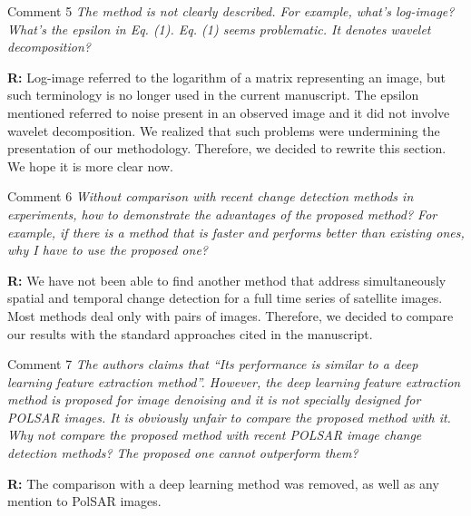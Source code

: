\documentclass[11pt]{report}
\begin{document}
\medskip
\begin{mybox}{Comment 5}
\textit{The method is not clearly described. For example, what’s log-image? What’s the epsilon in Eq. (1). Eq. (1) seems
problematic. It denotes wavelet decomposition?}


\medskip
\textbf{R:} Log-image referred to the logarithm of a matrix representing an image, but such terminology is no longer used in the current manuscript. The epsilon mentioned referred to noise present in an observed image and it did not involve wavelet decomposition. We realized that such problems were undermining the presentation of our methodology. Therefore, we decided to rewrite this section. We hope it is more clear now.

\medskip

\end{mybox}

\vspace{0.3cm}

\medskip
\begin{mybox}{Comment 6}
\textit{Without comparison with recent change detection methods in experiments, how to demonstrate the advantages of the
proposed method? For example, if there is a method that is faster and performs better than existing ones, why I have to
use the proposed one?}


\medskip
\textbf{R:} We have not been able to find another method that address simultaneously spatial and temporal change detection for a full time series of satellite images. Most methods deal only with pairs of images. Therefore, we decided to compare our results with the standard approaches cited in the manuscript.

\medskip

\end{mybox}

\vspace{0.3cm}

\medskip
\begin{mybox}{Comment 7}
\textit{The authors claims that “Its performance is similar to a deep learning feature extraction method”. However, the deep
learning feature extraction method is proposed for image denoising and it is not specially designed for POLSAR images.
It is obviously unfair to compare the proposed method with it. Why not compare the proposed method with recent
POLSAR image change detection methods? The proposed one cannot outperform them?}


\medskip
\textbf{R:} The comparison with a deep learning method was removed, as well as any mention to PolSAR images.

\medskip

\end{mybox}
\end{document}
